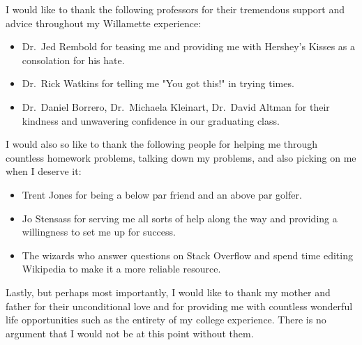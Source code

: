 I would like to thank the following professors for their tremendous support and advice throughout my Willamette experience:
\begin{itemize}
    \item Dr.~Jed Rembold for teasing me and providing me with Hershey's Kisses as a consolation for his hate.
    \item Dr.~Rick Watkins for telling me "You got this!" in trying times.
    \item Dr.~Daniel Borrero, Dr.~Michaela Kleinart, Dr.~David Altman for their kindness and unwavering confidence in our graduating class.
\end{itemize}

I would also so like to thank the following people for helping me through countless homework problems, talking down my problems, and also picking on me when I deserve it:

\begin{itemize}
    \item Trent Jones for being a below par friend and an above par golfer.
    \item Jo Stensass for serving me all sorts of help along the way and providing a willingness to set me up for success.
    \item The wizards who answer questions on Stack Overflow and spend time editing Wikipedia to make it a more reliable resource.

\end{itemize}

Lastly, but perhaps most importantly, I would like to thank my mother and father for their unconditional love and for providing me with countless wonderful life opportunities such as the entirety of my college experience.  There is no argument that I would not be at this point without them.
